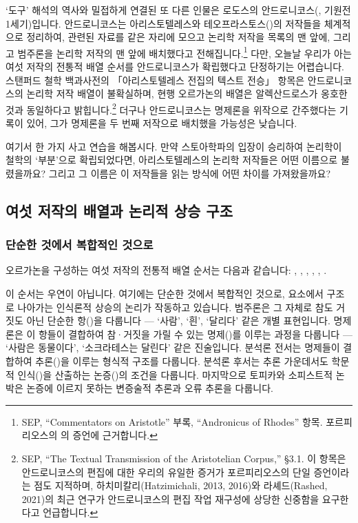 \documentclass[12pt, a4paper]{article}
\begin{document}
`도구' 해석의 역사와 밀접하게 연결된 또 다른 인물은 로도스의 안드로니코스(, 기원전 1세기)입니다. 안드로니코스는 아리스토텔레스와 테오프라스토스()의 저작들을 체계적으로 정리하여, 관련된 자료를 같은 자리에 모으고 논리학 저작을 목록의 맨 앞에, 그리고 범주론을 논리학 저작의 맨 앞에 배치했다고 전해집니다.\footnote{SEP, ``Commentators on Aristotle'' 부록, ``Andronicus of Rhodes'' 항목. 포르피리오스의 의 증언에 근거합니다.} 다만, 오늘날 우리가 아는 여섯 저작의 전통적 배열 순서를 안드로니코스가 확립했다고 단정하기는 어렵습니다. 스탠퍼드 철학 백과사전의 「아리스토텔레스 전집의 텍스트 전승」 항목은 안드로니코스의 논리학 저작 배열이 불확실하며, 현행 오르가논의 배열은 알렉산드로스가 옹호한 것과 동일하다고 밝힙니다.\footnote{SEP, ``The Textual Transmission of the Aristotelian Corpus,'' §3.1. 이 항목은 안드로니코스의 편집에 대한 우리의 유일한 증거가 포르피리오스의 단일 증언이라는 점도 지적하며, 하치미칼리(Hatzimichali, 2013, 2016)와 라셰드(Rashed, 2021)의 최근 연구가 안드로니코스의 편집 작업 재구성에 상당한 신중함을 요구한다고 언급합니다.} 더구나 안드로니코스는 명제론을 위작으로 간주했다는 기록이 있어, 그가 명제론을 두 번째 저작으로 배치했을 가능성은 낮습니다.

여기서 한 가지 사고 연습을 해봅시다. 만약 스토아학파의 입장이 승리하여 논리학이 철학의 `부분'으로 확립되었다면, 아리스토텔레스의 논리학 저작들은 어떤 이름으로 불렸을까요? 그리고 그 이름은 이 저작들을 읽는 방식에 어떤 차이를 가져왔을까요?

\subsection{여섯 저작의 배열과 논리적 상승 구조}

\subsubsection{단순한 것에서 복합적인 것으로}

오르가논을 구성하는 여섯 저작의 전통적 배열 순서는 다음과 같습니다: , , , , , .

이 순서는 우연이 아닙니다. 여기에는 단순한 것에서 복합적인 것으로, 요소에서 구조로 나아가는 인식론적 상승의 논리가 작동하고 있습니다. 범주론은 그 자체로 참도 거짓도 아닌 단순한 항()을 다룹니다 --- `사람', `흰', `달리다' 같은 개별 표현입니다. 명제론은 이 항들이 결합하여 참·거짓을 가릴 수 있는 명제()를 이루는 과정을 다룹니다 --- `사람은 동물이다', `소크라테스는 달린다' 같은 진술입니다. 분석론 전서는 명제들이 결합하여 추론()을 이루는 형식적 구조를 다룹니다. 분석론 후서는 추론 가운데서도 학문적 인식()을 산출하는 논증()의 조건을 다룹니다. 마지막으로 토피카와 소피스트적 논박은 논증에 이르지 못하는 변증술적 추론과 오류 추론을 다룹니다.
\end{document}
